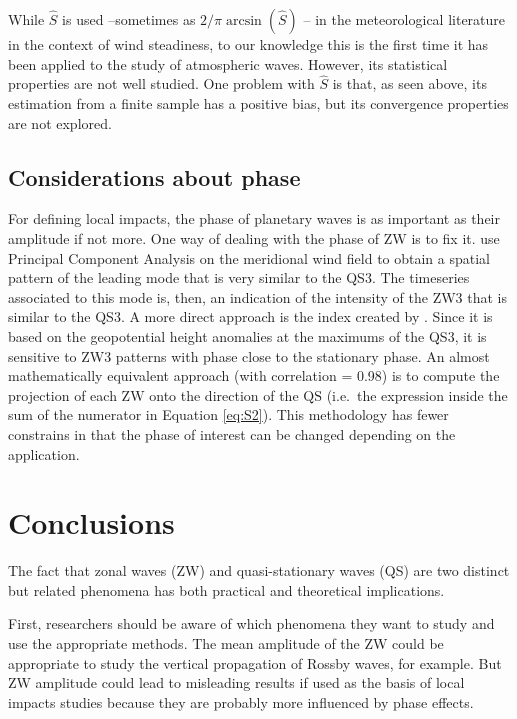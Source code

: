\documentclass[draft,linenumbers]{agujournal2018}
\begin{document}
While \(\hat{S}\) is used --sometimes as
\(2/\pi\arcsin \left (\hat{S} \right )\) \citep{Singer1967}-- in the
meteorological literature in the context of wind steadiness, to our
knowledge this is the first time it has been applied to the study of
atmospheric waves. However, its statistical properties are not well
studied. One problem with \(\hat{S}\) is that, as seen above, its
estimation from a finite sample has a positive bias, but its convergence
properties are not explored.

\subsection{Considerations about phase}

\label{sec:phase}

For defining local impacts, the phase of planetary waves is as important
as their amplitude if not more. One way of dealing with the phase of ZW
is to fix it. \citet{Yuan2008} use Principal Component Analysis on the
meridional wind field to obtain a spatial pattern of the leading mode
that is very similar to the QS3. The timeseries associated to this mode
is, then, an indication of the intensity of the ZW3 that is similar to
the QS3. A more direct approach is the index created by
\citet{Raphael2004}. Since it is based on the geopotential height
anomalies at the maximums of the QS3, it is sensitive to ZW3 patterns
with phase close to the stationary phase. An almost mathematically
equivalent approach (with correlation = 0.98) is to compute the
projection of each \(\mathrm{ZW}\) onto the direction of the
\(\mathrm{QS}\) (i.e.~the expression inside the sum of the numerator in
Equation \ref{eq:S2}). This methodology has fewer constrains in that the
phase of interest can be changed depending on the application.

\section{Conclusions}

The fact that zonal waves (ZW) and quasi-stationary waves (QS) are two
distinct but related phenomena has both practical and theoretical
implications.

First, researchers should be aware of which phenomena they want to study
and use the appropriate methods. The mean amplitude of the ZW could be
appropriate to study the vertical propagation of Rossby waves, for
example. But ZW amplitude could lead to misleading results if used as
the basis of local impacts studies because they are probably more
influenced by phase effects.
\end{document}
